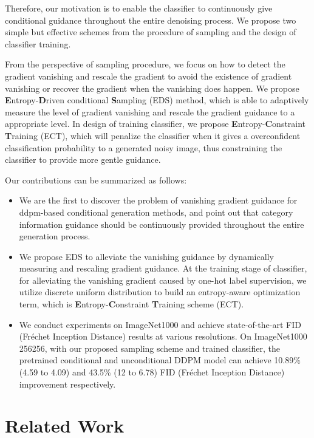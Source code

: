 \documentclass[runningheads]{llncs}
\begin{document}
Therefore, our motivation is to enable the classifier to continuously give conditional guidance throughout the entire denoising process. We propose two simple but effective schemes from the procedure of sampling and the design of classifier training.

From the perspective of sampling procedure, we focus on how to detect the gradient vanishing and rescale the gradient to avoid the existence of gradient vanishing or recover the gradient when the vanishing does happen. 
We propose \textbf{E}ntropy-\textbf{D}riven conditional \textbf{S}ampling (EDS) method, which is able to adaptively measure the level of gradient vanishing and rescale the gradient guidance to a appropriate level. 
In design of training classifier, we propose \textbf{E}ntropy-\textbf{C}onstraint \textbf{T}raining (ECT), which will penalize the classifier when it gives a overconfident classification probability to a generated noisy image, thus constraining the classifier to provide more gentle guidance.








Our contributions can be summarized as follows:
\begin{itemize}
    \item[] We are the first to discover the problem of vanishing gradient guidance for ddpm-based conditional generation methods, and point out that category information guidance should be continuously provided throughout the entire generation process.
    \item[]  We propose EDS to alleviate the vanishing guidance by dynamically measuring and rescaling gradient guidance.
At the training stage of classifier, for alleviating the vanishing gradient caused by one-hot label supervision, we utilize discrete uniform distribution to build an entropy-aware optimization term, which is \textbf{E}ntropy-\textbf{C}onstraint \textbf{T}raining scheme (ECT).
	\item[] We conduct experiments on ImageNet1000 and achieve state-of-the-art FID (Fréchet Inception Distance) results at various resolutions. On ImageNet1000 256256, with our proposed sampling scheme and trained classifier, the pretrained conditional and unconditional DDPM model can achieve 10.89\% (4.59 to 4.09) and 43.5\% (12 to 6.78) FID (Fréchet Inception Distance) improvement respectively. 
\end{itemize}

 \section{Related Work}
\end{document}
